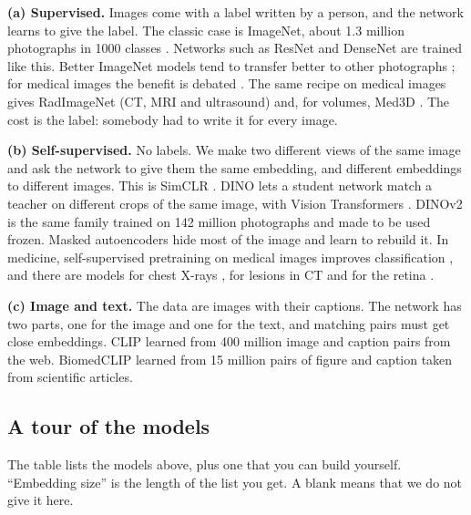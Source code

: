 \documentclass[11pt,a4paper]{article}
\begin{document}
\textbf{(a) Supervised.} Images come with a label written by a person, and the network learns to give the label.
The classic case is ImageNet, about 1.3 million photographs in 1000 classes \cite{deng2009imagenet}. Networks such
as ResNet \cite{he2016resnet} and DenseNet \cite{huang2017densenet} are trained like this. Better ImageNet models
tend to transfer better to other photographs \cite{kornblith2019transfer}; for medical images the benefit is
debated \cite{raghu2019transfusion}. The same recipe on medical images gives RadImageNet \cite{mei2022radimagenet}
(CT, MRI and ultrasound) and, for volumes, Med3D \cite{chen2019med3d}. The cost is the label: somebody had to write
it for every image.

\textbf{(b) Self-supervised.} No labels. We make two different views of the same image and ask the network to give them the same embedding, and different embeddings to different images. This is
SimCLR \cite{chen2020simclr}. DINO \cite{caron2021dino} lets a student network match a teacher on different crops of
the same image, with Vision Transformers \cite{dosovitskiy2021vit}. DINOv2 \cite{oquab2023dinov2} is the same family
trained on 142 million photographs and made to be used frozen. Masked autoencoders \cite{he2022mae} hide most of the
image and learn to rebuild it. In medicine, self-supervised pretraining on medical images improves classification
\cite{azizi2021selfsup}, and there are models for chest X-rays \cite{perezgarcia2025raddino}, for lesions in CT
\cite{pai2024foundation} and for the retina \cite{zhou2023foundation}.

\textbf{(c) Image and text.} The data are images with their captions. The network has two parts, one for the image
and one for the text, and matching pairs must get close embeddings. CLIP \cite{radford2021clip} learned from 400
million image and caption pairs from the web. BiomedCLIP \cite{zhang2023biomedclip} learned from 15 million pairs of
figure and caption taken from scientific articles.

\subsection{A tour of the models}\label{s:tour}

The table lists the models above, plus one that you can build yourself. ``Embedding size'' is the length of the
list you get. A blank means that we do not give it here.
\end{document}
